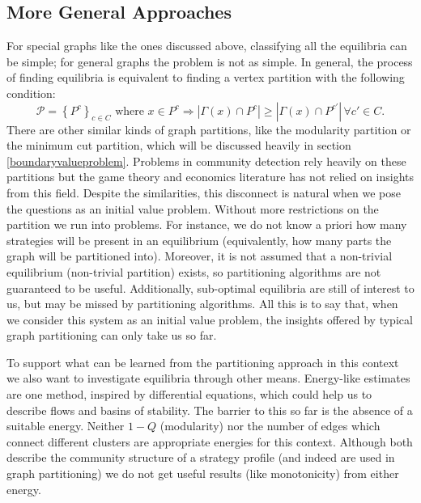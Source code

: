 \documentclass[]{article}
\begin{document}
		\subsection{More General Approaches}\label{moregeneralapproaches}
		For special graphs like the ones discussed above, classifying all the equilibria can be simple; for general graphs the problem is not as simple. In general, the process of finding equilibria is equivalent to finding a vertex partition with the following condition:
		\begin{equation}
			\mathcal{P}= \left\{P^{c}\right\}_{c\in C}\text{ where } x\in P^{c}\Rightarrow |\Gamma(x)\cap P^{c}|\geq |\Gamma(x)\cap P^{c'}|\, \forall c'\in C. 
		\end{equation}
		There are other similar kinds of graph partitions, like the modularity partition or the minimum cut partition, which will be discussed heavily in section \ref{boundaryvalueproblem}. 
		Problems in community detection rely heavily on these partitions but the game theory and economics literature has not relied on insights from this field. Despite the similarities, this disconnect is natural when we pose the questions as an initial value problem. Without more restrictions on the partition we run into problems. For instance, we do not know a priori how many strategies will be present in an equilibrium (equivalently, how many parts the graph will be partitioned into)\cite{Newman2006}. Moreover, it is not assumed that a non-trivial equilibrium (non-trivial partition) exists, so partitioning algorithms are not guaranteed to be useful.
		Additionally, sub-optimal equilibria are still of interest to us, but may be missed by partitioning algorithms\cite{Clauset2004}.  All this is to say that, when we consider this system as an initial value problem, the insights offered by typical graph partitioning can only take us so far. 
	
		To support what can be learned from the partitioning approach in this context we also want to investigate equilibria through other means. Energy-like estimates are one method,
		inspired by differential equations, which could help us to describe flows and basins of stability. The barrier to this so far is the absence of a suitable energy. Neither $1-Q$ (modularity) nor the number of edges which connect different clusters are appropriate energies for this context. Although both describe the community structure of a strategy profile (and indeed are used in graph partitioning) we do not get useful results (like monotonicity) from either energy. 
		
\end{document}
